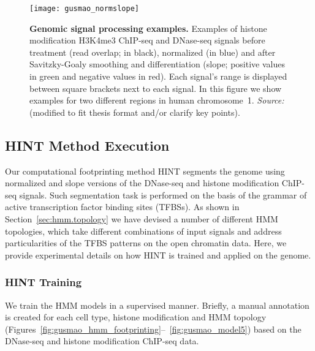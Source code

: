 \begin{figure}[h!]
\centering
\texttt{[image: gusmao\_normslope]}
\caption[Genomic signal processing examples]{\textbf{Genomic signal processing examples.} Examples of histone modification H3K4me3 ChIP-seq and DNase-seq signals before treatment (read overlap; in black), normalized (in blue) and after Savitzky-Goaly smoothing and differentiation (slope; positive values in green and negative values in red). Each signal's range is displayed between square brackets next to each signal. In this figure we show examples for two different regions in human chromosome~1. \emph{Source:~\cite{gusmao2014}} (modified to fit thesis format and/or clarify key points).}
\label{fig:gusmao_normslope}
\end{figure}

\subsection{HINT Method Execution}
\label{sec:hint.method.execution}

Our computational footprinting method HINT segments the genome using normalized and slope versions of the DNase-seq and histone modification ChIP-seq signals. Such segmentation task is performed on the basis of the grammar of active transcription factor binding sites (TFBSs). As shown in Section~\ref{sec:hmm.topology} we have devised a number of different HMM topologies, which take different combinations of input signals and address particularities of the TFBS patterns on the open chromatin data. Here, we provide experimental details on how HINT is trained and applied on the genome.

\subsubsection{HINT Training}

We train the HMM models in a supervised manner. Briefly, a manual annotation is created for each cell type, histone modification and HMM topology (Figures~\ref{fig:gusmao_hmm_footprinting}--~\ref{fig:gusmao_model5}) based on the DNase-seq and histone modification ChIP-seq data.

